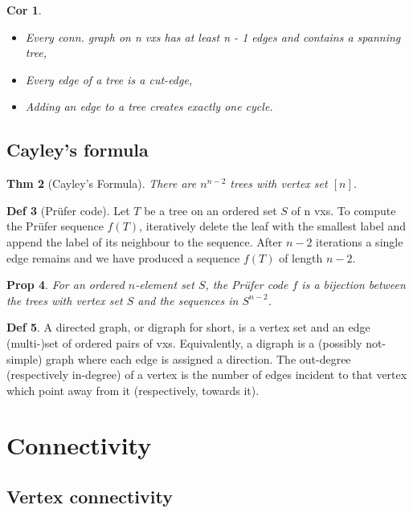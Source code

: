 \documentclass[11pt, fleqn, a4paper, landscape]{article}
\theoremstyle{plain} %
\newtheorem{thm}{Thm}
\newtheorem{pro}[thm]{Prop}
\newtheorem{cor}[thm]{Cor}
\theoremstyle{remark} %
\theoremstyle{definition} %
\newtheorem{defi}[thm]{Def}
\begin{document}
\begin{multicols}{5}
\begin{cor}
\begin{itemize}
\item  Every conn. graph on n vxs has at least n - 1 edges and contains a spanning tree,
\item Every edge of a tree is a cut-edge,
\item Adding an edge to a tree creates exactly one cycle.
\end{itemize}
\end{cor}

\subsection{Cayley’s formula}
\addtocounter{thm}{1}\addtocounter{thm}{1}
\begin{thm}[Cayley’s Formula]
There are $n^{n-2}$ trees with vertex set $[n]$.
\end{thm}

\begin{defi}[Prüfer code]
Let $T$ be a tree on an ordered set $S$ of n vxs. To compute the
Prüfer sequence $f(T)$, iteratively delete the leaf with the smallest label and append the label of its neighbour to the sequence. After $n - 2$ iterations a single edge remains and we have produced a sequence $f(T)$ of length $n - 2$.
\end{defi}
\addtocounter{thm}{1}
\begin{pro}
For an ordered $n$-element set $S$, the Prüfer code $f$ is a bijection between the trees with vertex set $S$ and the sequences in $S^{n-2}$.
\end{pro}
\addtocounter{thm}{1}
\begin{defi}
A directed graph, or digraph for short, is a vertex set and an edge (multi-)set of ordered pairs of vxs. Equivalently, a digraph is a (possibly not-simple) graph where each edge is assigned a direction. The out-degree (respectively in-degree) of a vertex is the number of edges
incident to that vertex which point away from it (respectively, towards it).
\end{defi}

\section{Connectivity}
\subsection{Vertex connectivity}


\end{multicols}
\end{document}
